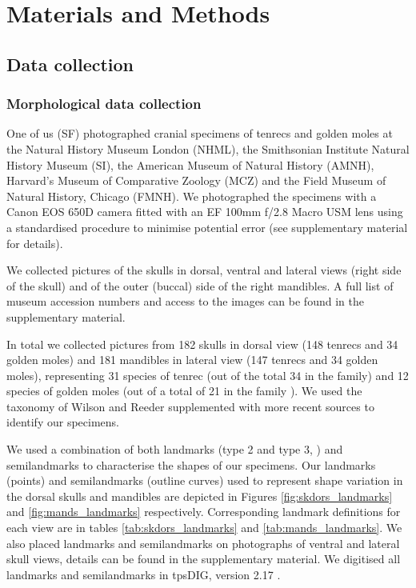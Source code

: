 \documentclass[12pt,a4paper]{article}
\begin{document}
\section{Materials and Methods}

\subsection{Data collection} 

\subsubsection{Morphological data collection} 
	
	One of us (SF) photographed cranial specimens of tenrecs and golden moles at the Natural History Museum London (NHML), the Smithsonian Institute Natural History Museum (SI), the American Museum of Natural History (AMNH), Harvard's Museum of Comparative Zoology (MCZ) and the Field Museum of Natural History, Chicago (FMNH). We photographed the specimens with a Canon EOS 650D camera fitted with an EF 100mm f/2.8 Macro USM lens using a standardised procedure to minimise potential error (see supplementary material for details). 

	We collected pictures of the skulls in dorsal, ventral and lateral views (right side of the skull) and of the outer (buccal) side of the right mandibles. A full list of museum accession numbers and access to the images can be found in the supplementary material.

	In total we collected pictures from 182 skulls in dorsal view (148 tenrecs and 34 golden moles) and 181 mandibles in lateral view (147 tenrecs and 34 golden moles), representing 31 species of tenrec (out of the total 34 in the family) and 12 species of golden moles (out of a total of 21 in the family \citep{Asher2010}). We used the taxonomy of Wilson and Reeder \citeyearpar{Wilson2005} supplemented with more recent sources \citep{IUCN2012, Olson2013} to identify our specimens. 
	

	We used a combination of both landmarks (type 2 and type 3, \citep{Zelditch2012}) and semilandmarks to characterise the shapes of our specimens. Our landmarks (points) and semilandmarks (outline curves) used to represent shape variation in the dorsal skulls and mandibles are depicted in Figures \ref{fig:skdors_landmarks} and \ref{fig:mands_landmarks} respectively. Corresponding landmark definitions for each view are in tables \ref{tab:skdors_landmarks} and \ref{tab:mands_landmarks}. We also placed landmarks and semilandmarks on photographs of ventral and lateral skull views, details can be found in the supplementary material. We digitised all landmarks and semilandmarks in tpsDIG, version 2.17 \citep{Rohlf2013}.
\end{document}
